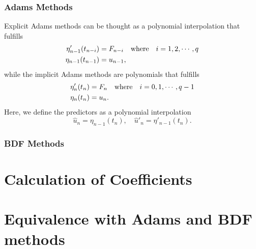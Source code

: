 \documentclass[11pt,a4paper]{article}
\begin{document}
\subsubsection{Adams Methods}
Explicit Adams methods can be thought as a polynomial interpolation that
fulfills
\begin{align}
  \eta'_{n-1}(t_{n-i})&=F_{n-i}\qq{where} i=1,2,\cdots,q \\
  \eta_{n-1}(t_{n-1})&=u_{n-1},
\end{align}
while the implicit Adams methods are polynomials that fulfills
\begin{align}
  \eta'_{n}(t_{n})&=F_{n}\qq{where} i=0,1,\cdots,q-1 \\
  \eta_{n}(t_{n})&=u_{n}.
\end{align}
Here, we define the predictors as a polynomial interpolation
\begin{equation}
  \hat{u}_n = \eta_{n-1}(t_n),\quad \hat{u}'_n = \eta'_{n-1}(t_n).
\end{equation}

\subsubsection{BDF Methods}

\section{Calculation of Coefficients}

\section{Equivalence with Adams and BDF methods}
\end{document}
